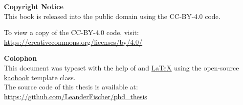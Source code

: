 \begin{flushleft}	
	\vspace*{8cm}
	
	\textbf{Copyright Notice}\\
	This book is released into the public domain using the CC-BY-4.0 code.

	To view a copy of the CC-BY-4.0 code, visit: \\\url{https://creativecommons.org/licenses/by/4.0/}

	\medskip
	
	\textbf{Colophon} \\
	This document was typeset with the help of \href{https://sourceforge.net/projects/koma-script/}{\KOMAScript} and \href{https://www.latex-project.org/}{\LaTeX} using the open-source \href{https://github.com/fmarotta/kaobook/}{kaobook} template class.\\
	
	The source code of this thesis is available  at: \\\url{https://github.com/LeanderFischer/phd_thesis}

	\medskip

\end{flushleft}
	




